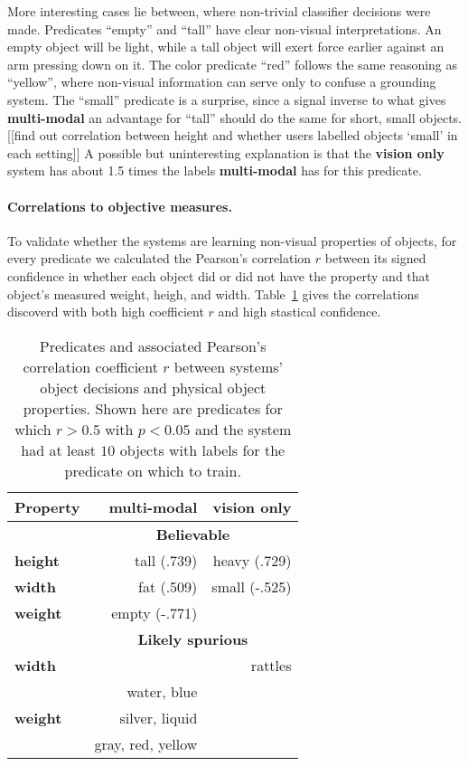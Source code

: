 More interesting cases lie between, where non-trivial classifier decisions were made.
Predicates ``empty'' and ``tall'' have clear non-visual interpretations.
An empty object will be light, while a tall object will exert force earlier against an arm pressing down on it.
The color predicate ``red'' follows the same reasoning as ``yellow'', where non-visual information can serve only to confuse a grounding system.
The ``small'' predicate is a surprise, since a signal inverse to what gives \textbf{multi-modal} an advantage for ``tall'' should do the same for short, small objects.
[[find out correlation between height and whether users labelled objects `small' in each setting]]
A possible but uninteresting explanation is that the \textbf{vision only} system has about 1.5 times the labels \textbf{multi-modal} has for this predicate.

\paragraph{Correlations to objective measures.}
To validate whether the systems are learning non-visual properties of objects, for every predicate we calculated the Pearson's correlation $r$ between its signed confidence in whether each object did or did not have the property and that object's measured weight, heigh, and width. Table~\ref{tab:predicate_correlations} gives the correlations discoverd with both high coefficient $r$ and high stastical confidence.

\begin{table}
\centering
\begin{tabular}[h]{|l|r|r|}
	\hline
	\bf Property & \bf multi-modal & \bf vision only \\ \hline \hline
	& \multicolumn{2}{c|}{\bf Believable} \\ \hline
	\bf height & tall (.739) & heavy (.729) \\ \hline
	\bf width & fat (.509) & small (-.525) \\ \hline
	\bf weight & empty (-.771) & \\ \hline \hline
	& \multicolumn{2}{c|}{\bf Likely spurious} \\ \hline
	\bf width & & rattles \\ \hline
	& water, blue & \\
	\bf weight & silver, liquid & \\ 
	& gray, red, yellow & \\ \hline

\end{tabular}
\caption{Predicates and associated Pearson's correlation coefficient $r$ between systems' object decisions and physical object properties.
Shown here are predicates for which $r>0.5$ with $p<0.05$ and the system had at least $10$ objects with labels for the predicate on which to train.}
\label{tab:predicate_correlations}
\end{table}

